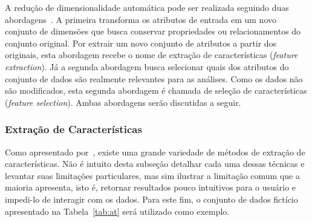 A redução de dimensionalidade automática pode ser realizada
seguindo duas abordagens~\cite{Pudil1998}. A primeira
transforma os atributos de entrada em um novo conjunto de
dimensões que busca conservar propriedades ou
relacionamentos do conjunto original. Por extrair um novo
conjunto de atributos a partir dos originais, esta abordagem
recebe o nome de extração de características (\emph{feature
extraction}). Já a segunda abordagem busca selecionar quais
dos atributos do conjunto de dados são realmente relevantes
para as análises. Como os dados não são
modificados, esta segunda abordagem é chamada de seleção de
características (\emph{feature selection}). Ambas 
abordagens serão discutidas a seguir.

\subsubsection{Extração de Características}

Como apresentado por~\citet{Maaten2009}, existe uma grande
variedade de métodos de extração de características. Não é
intuito desta subseção detalhar cada uma dessas técnicas e
levantar suas limitações particulares, mas sim ilustrar a
limitação comum que a maioria apresenta, isto é, retornar
resultados pouco intuitivos para o usuário e impedi-lo de
interagir com os dados. Para este fim, o conjunto de dados
fictício apresentado na Tabela~\ref{tab:at} será utilizado como
exemplo.

